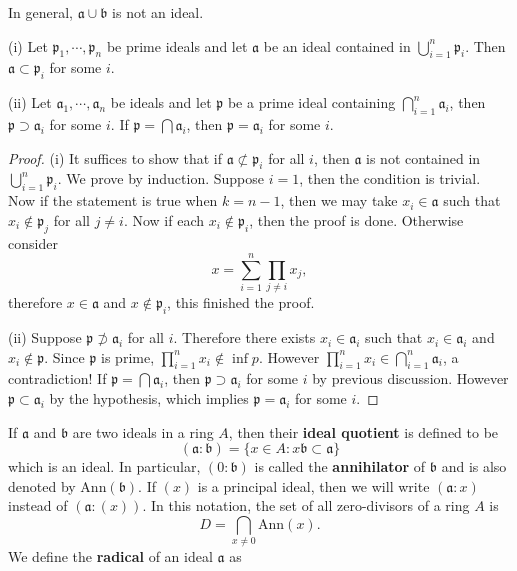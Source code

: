 In general, $\mathfrak{a}\cup\mathfrak{b}$ is not an ideal.
\begin{proposition}
(i) Let $\mathfrak{p}_1,\cdots,\mathfrak{p}_n$ be prime ideals and let $\mathfrak{a}$ be an ideal contained in $\bigcup_{i=1}^n\mathfrak{p}_i$. Then $\mathfrak{a}\subset\mathfrak{p}_i$ for some $i$.\par
(ii) Let $\mathfrak{a}_1,\cdots,\mathfrak{a}_n$ be ideals and let $\mathfrak{p}$ be a prime ideal containing $\bigcap_{i=1}^n\mathfrak{a}_i$, then $\mathfrak{p}\supset\mathfrak{a}_i$ for some $i$. If $\mathfrak{p}=\bigcap\mathfrak{a}_i$, then $\mathfrak{p}=\mathfrak{a}_i$ for some $i$.
\end{proposition}
\begin{proof}
(i) It suffices to show that if $\mathfrak{a}\not\subset\mathfrak{p}_i$ for all $i$, then $\mathfrak{a}$ is not contained in $\bigcup_{i=1}^n\mathfrak{p}_i$.
We prove by induction. Suppose $i=1$, then the condition is trivial. Now if the statement is true when $k=n-1$, then we may take $x_i\in\mathfrak{a}$ such that $x_i\notin\mathfrak{p}_j$ for all $j\ne i$. Now if each $x_i\notin\mathfrak{p}_i$, then the proof is done. Otherwise consider 
$$
x=\sum_{i=1}^n{\prod_{j\ne i}{x_j}},
$$
therefore $x\in\mathfrak{a}$ and $x\notin\mathfrak{p}_i$, this finished the proof.\par
(ii) Suppose $\mathfrak{p}\not\supset\mathfrak{a}_i$ for all $i$. Therefore there exists $x_i\in\mathfrak{a}_i$ such that $x_i\in\mathfrak{a}_i$ and $x_i\notin\mathfrak{p}$. Since $\mathfrak{p}$ is prime, $\prod_{i=1}^nx_i\notin\inf{p}$. However $\prod_{i=1}^nx_i\in\bigcap_{i=1}^n\mathfrak{a}_i$, a contradiction! If $\mathfrak{p}=\bigcap\mathfrak{a}_i$, then $\mathfrak{p}\supset\mathfrak{a}_i$ for some $i$ by previous discussion. However $\mathfrak{p}\subset\mathfrak{a}_i$ by the hypothesis, which implies $\mathfrak{p}=\mathfrak{a}_i$ for some $i$.
\end{proof}
If $\mathfrak{a}$ and $\mathfrak{b}$ are two ideals in a ring $A$, then their \textbf{ideal quotient} is defined to be 
$$(\mathfrak{a}:\mathfrak{b})=\{x\in A:x\mathfrak{b}\subset\mathfrak{a}\}$$
which is an ideal. In particular, $(0:\mathfrak{b})$ is called the \textbf{annihilator} of $\mathfrak{b}$ and is also denoted by $\mathrm{Ann}(\mathfrak{b})$. If $(x)$ is a principal ideal, then we will write $(\mathfrak{a}:x)$ instead of $(\mathfrak{a}:(x))$. In this notation, the set of all zero-divisors of a ring $A$ is 
$$
D=\bigcap_{x\ne 0}{\mathrm{Ann}\left( x \right)}.
$$
We define the \textbf{radical} of an ideal $\mathfrak{a}$ as 
